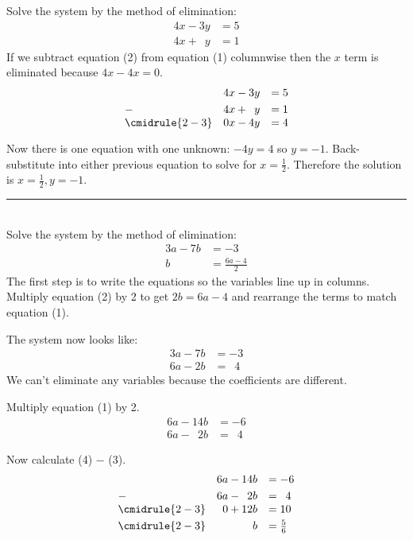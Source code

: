 \example Solve the system by the method of elimination:
\begin{align*}
4x-3y&=5\tag{1}\\
4x+\phantom{1}y&=1\tag{2}
\end{align*}
\solution If we subtract equation (2) from equation (1) columnwise then the $x$ term is eliminated because $4x-4x=0$.
\[\begin{array}{lrl}
  			 &4x-3y	         &=5 \\[\jot]
 -\phantom{1}&4x+\phantom{1}y&=1 \\
\cmidrule{2-3}
 & 0x-4y &=4  \\[\jot]
\end{array}\]
Now there is one equation with one unknown: $-4y=4$ so $y=-1$. Back-substitute into either previous equation to solve for $x=\frac{1}{2}$. Therefore the solution is $x=\frac{1}{2},y=-1$.\\
\rule{6.8cm}{0.5pt}\\
\example Solve the system by the method of elimination:
\begin{align*}
3a-7b&=-3\tag{1}\\
b&=\frac{6a-4}{2}\tag{2}
\end{align*}
\solution The first step is to write the equations so the variables line up in columns. Multiply equation (2) by 2 to get $2b=6a-4$ and rearrange the terms to match equation (1). 

\begin{minipage}[t]{0.3\linewidth}
The system now looks like:
\begin{align*}
3a-7b&=-3\tag{1}\\
6a-2b&=\phantom{1}4\tag{3}
\end{align*}
We can't eliminate any variables because the coefficients are different. 
\end{minipage}
\hspace{\fill}
\begin{minipage}[t]{0.3\linewidth}
Multiply equation (1) by 2.
\begin{align*}
6a-14b&=-6\tag{4}\\
6a-\phantom{1}2b&=\phantom{1}4\tag{3}
\end{align*}
\end{minipage}
\hspace{\fill}
\begin{minipage}[t]{0.3\linewidth}
Now calculate (4) $-$ (3).	
\[\begin{array}{lrl}
			&	       6a-14b&=-6			\\[\jot]
-\phantom{1}&6a-\phantom{1}2b&=\phantom{1}4 \\
\cmidrule{2-3}
& 0+12b&=10  \\[\jot]
\cmidrule{2-3}
& b&=\frac{5}{6}  \\[\jot]
\end{array}\]	
\end{minipage}

